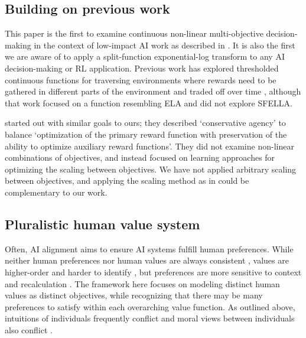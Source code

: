 

\subsection{Building on previous work}

This paper is the first to examine continuous non-linear multi-objective decision-making in the context of low-impact AI work as described in \cite{vamplew_potential-based_2021}. It is also the first we are aware of to apply a split-function exponential-log transform to any AI decision-making or RL application.  Previous work has explored thresholded continuous functions for traversing environments where rewards need to be gathered in different parts of the environment and traded off over time \cite{rolf_need_2020}, although that work focused on a function resembling ELA and did not explore SFELLA. 

\cite{turner_conservative_2020} started out with similar goals to ours; they described `conservative agency' to balance `optimization of the primary reward function with preservation of the ability to optimize auxiliary reward functions'. They did not examine non-linear combinations of objectives, and instead focused on learning approaches for optimizing the scaling between objectives. We have not applied arbitrary scaling between objectives, and applying the scaling method as in \cite{turner_conservative_2020} could be complementary to our work.


\subsection{Pluralistic human value system}

Often, AI alignment aims to ensure AI systems fulfill human preferences. While neither human preferences nor human values are always consistent \cite{sotala2016defining}, values are higher-order and harder to identify \cite{barrett2008learning}, but preferences are more sensitive to context and recalculation \cite{warren2011values}. The framework here focuses on modeling distinct human values as distinct objectives, while recognizing that there may be many preferences to satisfy within each overarching value function. As outlined above, intuitions of individuals frequently conflict \cite{haidt2001emotional} and moral views between individuals also conflict \cite{bogosian_implementation_2017}.


